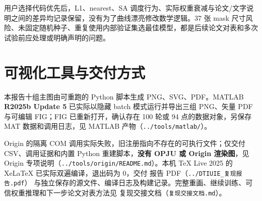 \documentclass[UTF8,11pt,a4paper,fontset=windows]{ctexart}
\begin{document}
用户选择代码优先后，L1、nearest、SA 调度行为、实际权重衰减与论文/文字说明之间的差异均记录保留，没有为了曲线漂亮修改数学逻辑。37 张 mask 尺寸风险、未固定随机种子、重复使用内部验证集选最佳模型，都是后续论文对表和多次试验前应处理或明确声明的问题。

\section{可视化工具与交付方式}

本报告十组主图由可重跑的 Python 脚本生成 PNG、SVG、PDF。MATLAB \textbf{R2025b Update 5} 已实际以隐藏 batch 模式运行并导出三组 PNG、矢量 PDF 与可编辑 FIG；FIG 已重新打开，确认存在 100 轮或 94 点的数据对象，另保存 MAT 数据和调用日志，见 MATLAB 产物（\texttt{.\allowbreak{}.\allowbreak{}/\allowbreak{}tools/\allowbreak{}mat\allowbreak{}lab/\allowbreak{}}）。

Origin 的隔离 COM 调用实际失败，旧注册指向不存在的可执行文件；仅交付 CSV、调用证据和内置 Python 重建脚本，\textbf{没有 OPJU 或 Origin 渲染图}，见 Origin 专项说明（\texttt{.\allowbreak{}.\allowbreak{}/\allowbreak{}tools/\allowbreak{}ori\allowbreak{}gin/\allowbreak{}README.\allowbreak{}m\allowbreak{}d}）。本机 TeX Live 2025 的 XeLaTeX 已实际双遍编译，退出码为 0，交付 报告 PDF（\texttt{.\allowbreak{}.\allowbreak{}/\allowbreak{}DTIUIE\_\allowbreak{}复现\allowbreak{}报告.\allowbreak{}pdf}） 与独立保存的源文件、编译日志及构建记录。完整重画、继续训练、可信权重推理和下一步论文对表方法见 复现交接文档（\texttt{复现交接文档.\allowbreak{}md}）。
\end{document}
